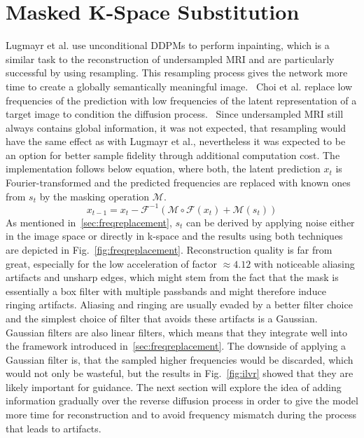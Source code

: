 \section{Masked K-Space Substitution}
Lugmayr et al. use unconditional DDPMs to perform inpainting, which is a similar task to the reconstruction of undersampled MRI and are particularly successful by using resampling. This resampling process gives the network more time to create a globally semantically meaningful image.~\autocite{lugmayr2022repaint} Choi et al. replace low frequencies of the prediction with low frequencies of the latent representation of a target image to condition the diffusion process.~\autocite{choi2021ilvr} Since undersampled MRI still always contains global information, it was not expected, that resampling would have the same effect as with Lugmayr et al., nevertheless it was expected to be an option for better sample fidelity through additional computation cost. The implementation follows below equation, where both, the latent prediction $x_t$ is Fourier-transformed and the predicted frequencies are replaced with known ones from $s_t$ by the masking operation $\mathcal{M}$.
\begin{equation}
    x_{t-1} = x_t - \mathcal{F}^{-1}\left(\mathcal{M}\circ\mathcal{F}(x_t) + \mathcal{M}(s_t)\right)
\end{equation}
As mentioned in~\ref{sec:freqreplacement}, $s_t$ can be derived by applying noise either in the image space or directly in k-space and the results using both techniques are depicted in Fig.~\ref{fig:freqreplacement}. Reconstruction quality is far from great, especially for the low acceleration of factor $\approx 4.12$ with noticeable aliasing artifacts and unsharp edges, which might stem from the fact that the mask is essentially a box filter with multiple passbands and might therefore induce ringing artifacts. Aliasing and ringing are usually evaded by a better filter choice and the simplest choice of filter that avoids these artifacts is a Gaussian. Gaussian filters are also linear filters, which means that they integrate well into the framework introduced in~\ref{sec:freqreplacement}. The downside of applying a Gaussian filter is, that the sampled higher frequencies would be discarded, which would not only be wasteful, but the results in Fig.~\ref{fig:ilvr} showed that they are likely important for guidance. The next section will explore the idea of adding information gradually over the reverse diffusion process in order to give the model more time for reconstruction and to avoid frequency mismatch during the process that leads to artifacts.
